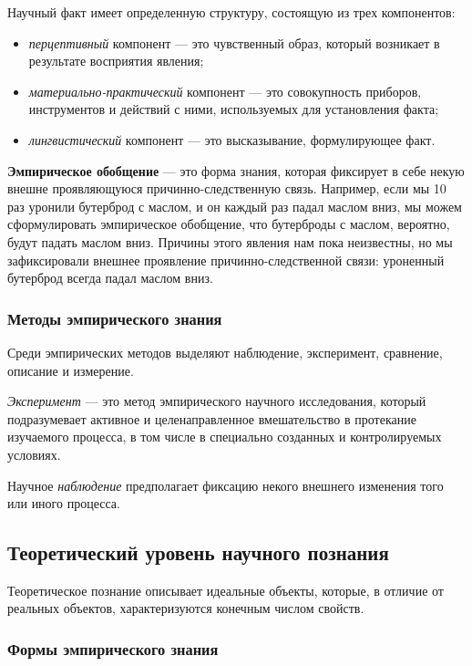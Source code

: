 Научный факт имеет определенную структуру, состоящую из трех
компонентов:
\begin{itemize}
    \item \textit{перцептивный} компонент --- это чувственный образ, который возникает в
    результате восприятия явления;
    \item \textit{материально-практический} компонент --- это
    совокупность приборов, инструментов и действий с ними, используемых для
    установления факта;
    \item \textit{лингвистический} компонент --- это высказывание, формулирующее факт.
\end{itemize}


\textbf{Эмпирическое обобщение} --- это форма знания, которая фиксирует в
себе некую внешне проявляющуюся причинно-следственную связь. Например, если мы 10 раз уронили бутерброд с маслом, и он каждый раз падал маслом вниз, мы можем сформулировать эмпирическое обобщение, что бутерброды с маслом, вероятно, будут падать маслом вниз. Причины этого явления нам пока неизвестны, но мы зафиксировали внешнее проявление причинно-следственной связи: уроненный бутерброд всегда падал маслом вниз.

\subsubsection{Методы эмпирического знания}

Среди эмпирических методов выделяют наблюдение, эксперимент, сравнение, описание и измерение.

\textit{Эксперимент} --- это метод эмпирического научного
исследования, который подразумевает активное и целенаправленное вмешательство в
протекание изучаемого процесса, в том числе в специально созданных и
контролируемых условиях. 

Научное \textit{наблюдение} предполагает фиксацию некого внешнего изменения того или иного процесса. 

\subsection{Теоретический уровень научного познания}

Теоретическое познание описывает идеальные объекты,
которые, в отличие от реальных объектов, характеризуются конечным числом свойств. 

\subsubsection{Формы эмпирического знания}

